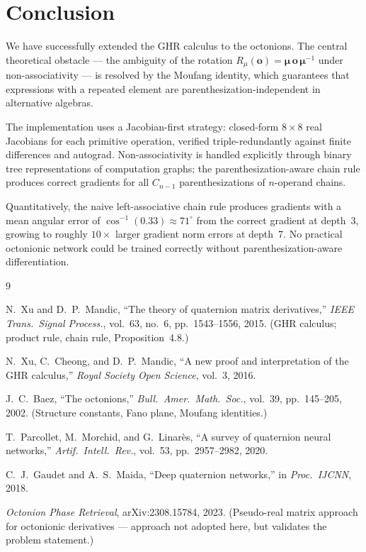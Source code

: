 \documentclass[11pt]{article}
\begin{document}
\section{Conclusion}

We have successfully extended the GHR calculus to the octonions.  The central
theoretical obstacle --- the ambiguity of the rotation $R_\mu(\mathbf{o}) =
\boldsymbol{\mu}\,\mathbf{o}\,\boldsymbol{\mu}^{-1}$ under non-associativity
--- is resolved by the Moufang identity, which guarantees that expressions
with a repeated element are parenthesization-independent in alternative algebras.

The implementation uses a Jacobian-first strategy: closed-form $8\times 8$
real Jacobians for each primitive operation, verified triple-redundantly against
finite differences and autograd.  Non-associativity is handled explicitly through
binary tree representations of computation graphs; the parenthesization-aware
chain rule produces correct gradients for all $C_{n-1}$ parenthesizations of
$n$-operand chains.

Quantitatively, the naive left-associative chain rule produces gradients with
a mean angular error of $\cos^{-1}(0.33) \approx 71^\circ$ from the correct
gradient at depth~3, growing to roughly $10\times$ larger gradient norm errors
at depth~7.  No practical octonionic network could be trained correctly without
parenthesization-aware differentiation.

\begin{thebibliography}{9}

  N.~Xu and D.~P.~Mandic,
  ``The theory of quaternion matrix derivatives,''
  \emph{IEEE Trans.\ Signal Process.}, vol.~63, no.~6, pp.~1543--1556, 2015.
  (GHR calculus; product rule, chain rule, Proposition~4.8.)

  N.~Xu, C.~Cheong, and D.~P.~Mandic,
  ``A new proof and interpretation of the GHR calculus,''
  \emph{Royal Society Open Science}, vol.~3, 2016.

  J.~C.~Baez,
  ``The octonions,''
  \emph{Bull.\ Amer.\ Math.\ Soc.}, vol.~39, pp.~145--205, 2002.
  (Structure constants, Fano plane, Moufang identities.)

  T.~Parcollet, M.~Morchid, and G.~Linar\`es,
  ``A survey of quaternion neural networks,''
  \emph{Artif.\ Intell.\ Rev.}, vol.~53, pp.~2957--2982, 2020.

  C.~J.~Gaudet and A.~S.~Maida,
  ``Deep quaternion networks,''
  in \emph{Proc.\ IJCNN}, 2018.

  \emph{Octonion Phase Retrieval},
  arXiv:2308.15784, 2023.
  (Pseudo-real matrix approach for octonionic derivatives --- approach not
   adopted here, but validates the problem statement.)

\end{thebibliography}
\end{document}
